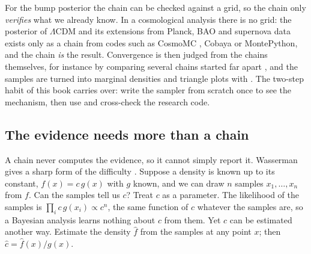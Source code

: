 \begin{inpractice}
For the bump posterior the chain can be checked against a grid, so the chain only
\emph{verifies} what we already know. In a cosmological analysis there is no grid: the
posterior of $\Lambda$CDM and its extensions from Planck, BAO and supernova data exists
only as a chain from codes such as CosmoMC \cite{LewisBridle2002}, Cobaya or
MontePython, and the chain \emph{is} the result. Convergence is then judged from the
chains themselves, for instance by comparing several chains started far apart
\cite{GelmanRubin1992}, and the samples are turned into marginal densities and triangle
plots with . The two-step habit of this book carries over: write the
sampler from scratch once to see the mechanism, then use and cross-check the research
code.
\end{inpractice}

\subsection{The evidence needs more than a chain}
\label{5c:sec:evidence-from-samples}

A chain never computes the evidence, so it cannot simply report it. Wasserman gives a
sharp form of the difficulty . Suppose a density is known up to
its constant, $f(x)=c\,g(x)$ with $g$ known, and we can draw $n$ samples $x_1,\dots,x_n$
from $f$. Can the samples tell us $c$? Treat $c$ as a parameter. The likelihood of the
samples is $\prod_i c\,g(x_i)\propto c^n$, the same function of $c$ whatever the samples
are, so a Bayesian analysis learns nothing about $c$ from them. Yet $c$ can be
estimated another way. Estimate the density $\hat f$ from the samples at any point $x$;
then $\hat c=\hat f(x)/g(x)$.

